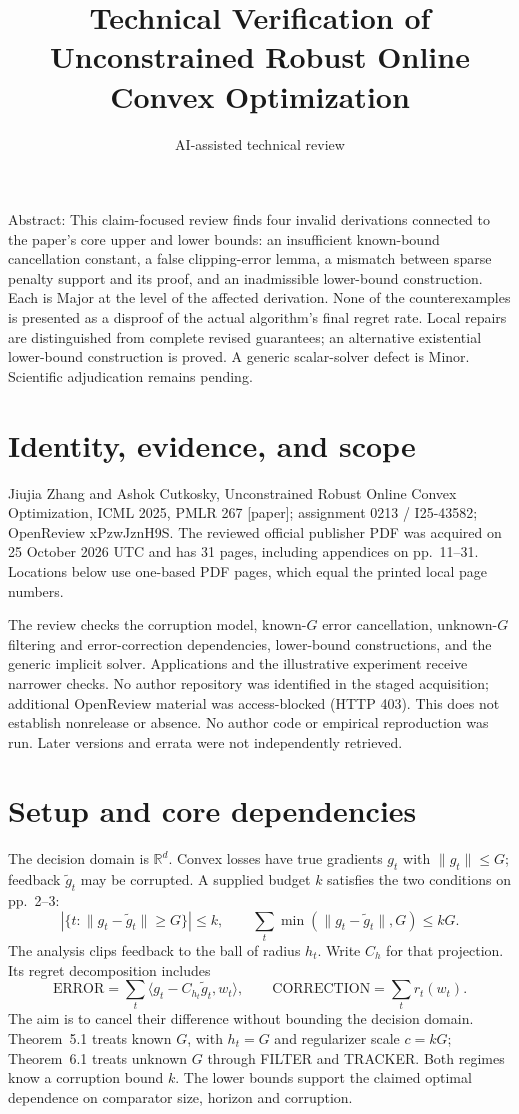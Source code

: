 \documentclass[10pt]{article}
\title{Technical Verification of Unconstrained Robust Online Convex Optimization}
\author{AI-assisted technical review}
\date{}
\begin{document}
\maketitle
Abstract: This claim-focused review finds four invalid derivations connected to the paper’s core upper and lower bounds: an insufficient known-bound cancellation constant, a false clipping-error lemma, a mismatch between sparse penalty support and its proof, and an inadmissible lower-bound construction. Each is Major at the level of the affected derivation. None of the counterexamples is presented as a disproof of the actual algorithm’s final regret rate. Local repairs are distinguished from complete revised guarantees; an alternative existential lower-bound construction is proved. A generic scalar-solver defect is Minor. Scientific adjudication remains pending.\par
\section*{Identity, evidence, and scope}
Jiujia Zhang and Ashok Cutkosky, Unconstrained Robust Online Convex Optimization, ICML 2025, PMLR 267 [paper]; assignment 0213 / I25-43582; OpenReview xPzwJznH9S. The reviewed official publisher PDF was acquired on 25 October 2026 UTC and has 31 pages, including appendices on pp. 11–31. Locations below use one-based PDF pages, which equal the printed local page numbers.\par
The review checks the corruption model, known-\(G\) error cancellation, unknown-\(G\) filtering and error-correction dependencies, lower-bound constructions, and the generic implicit solver. Applications and the illustrative experiment receive narrower checks. No author repository was identified in the staged acquisition; additional OpenReview material was access-blocked (HTTP 403). This does not establish nonrelease or absence. No author code or empirical reproduction was run. Later versions and errata were not independently retrieved.\par
\section*{Setup and core dependencies}
The decision domain is \(\mathbb R^d\). Convex losses have true gradients \(g_t\) with \(\|g_t\|\le G\); feedback \(\widetilde g_t\) may be corrupted. A supplied budget \(k\) satisfies the two conditions on pp. 2–3: \[|\{t:\|g_t-\widetilde g_t\|\ge G\}|\le k,\qquad
 \sum_t\min(\|g_t-\widetilde g_t\|,G)\le kG .\] The analysis clips feedback to the ball of radius \(h_t\). Write \(C_h\) for that projection. Its regret decomposition includes \[\mathrm{ERROR}=\sum_t\langle g_t-C_{h_t}\widetilde g_t,w_t\rangle,\qquad
 \mathrm{CORRECTION}=\sum_t r_t(w_t).\] The aim is to cancel their difference without bounding the decision domain. Theorem 5.1 treats known \(G\), with \(h_t=G\) and regularizer scale \(c=kG\); Theorem 6.1 treats unknown \(G\) through FILTER and TRACKER. Both regimes know a corruption bound \(k\). The lower bounds support the claimed optimal dependence on comparator size, horizon and corruption.\par
\end{document}
